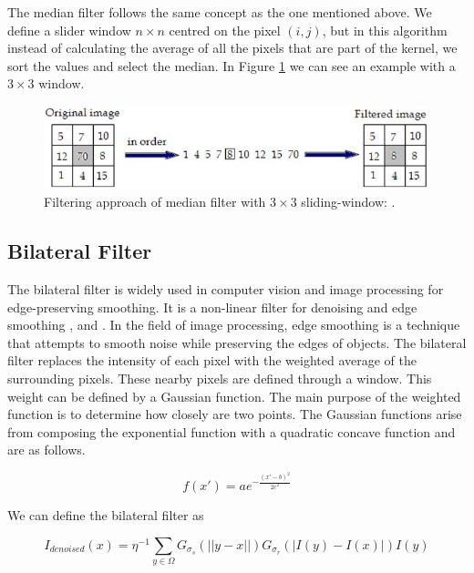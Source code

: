 \documentclass[titlepage,12pt]{report}
\begin{document}
The median filter follows the same concept as the one mentioned above. We define a slider window $n \times n$ centred on the pixel $(i,j)$, but in this algorithm instead of calculating the average of all the pixels that are part of the kernel, we sort the values and select the median. In Figure \ref{median_filter} we can see an example with a $3 \times 3$ window.

\begin{figure}[H]
	\centering
	\includegraphics[scale=0.45]{media/median_filter.jpg}
	\caption{Filtering approach of median filter with $3 \times 3$ sliding-window: \citep{Lyra2011}.}
	\label{median_filter}
\end{figure}

\subsection{Bilateral Filter}

The bilateral filter is widely used in computer vision and image processing for edge-preserving smoothing. It is a non-linear filter for denoising and edge smoothing \citep[pp.~538--545]{Aurich1995}, \citep[pp.~839--846]{Tomasi1998} and \citep[pp.~1--73]{Paris2009}. In the field of image processing, edge smoothing is a technique that attempts to smooth noise while preserving the edges of objects. The bilateral filter replaces the intensity of each pixel with the weighted average of the surrounding pixels. These nearby pixels are defined through a window. This weight can be defined by a Gaussian function. The main purpose of the weighted function is to determine how closely are two points. The Gaussian functions arise from composing the exponential function with a quadratic concave function and are as follows.

\begin{equation}\label{gaussian_function}
f(x') = a e^{-\frac{(x'-b)^2}{2c^2}}
\end{equation}

We can define the bilateral filter as

\begin{equation}
I_{denoised}(x) = \eta^{-1} \sum_{y \in \Omega} G_{\sigma_s}(||y - x||) G_{\sigma_r}(|I(y) - I(x)|)I(y)
\end{equation}
\end{document}
